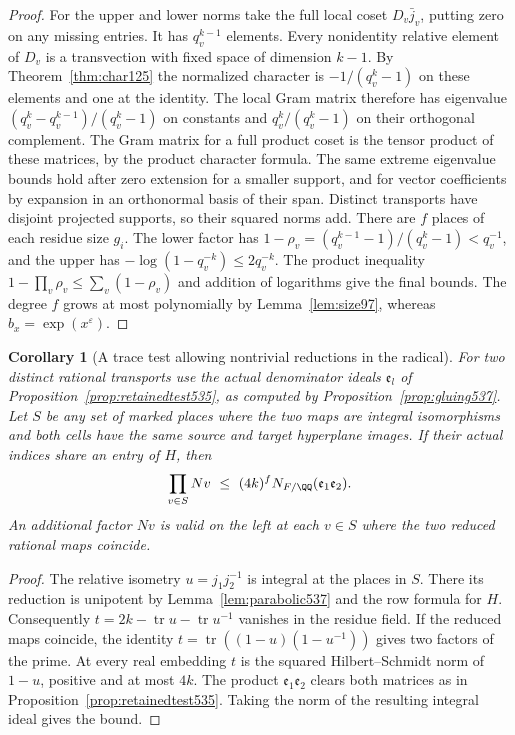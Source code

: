 \documentclass[a4paper,11pt]{article}
\newtheorem{corollary}[proposition]{Corollary}
\theoremstyle{definition}
\theoremstyle{remark}
\numberwithin{equation}{section}
\begin{document}
\begin{proof}
For the upper and lower norms take the full local coset
\(D_v\bar j_v\), putting zero on any missing entries.
It has \(q_v^{k-1}\) elements. Every nonidentity relative
element of \(D_v\) is a transvection with fixed space of
dimension \(k-1\). By Theorem~\ref{thm:char125} the normalized
character is \(-1/(q_v^k-1)\) on these elements and one at
the identity. The local Gram matrix therefore has eigenvalue
\((q_v^k-q_v^{k-1})/(q_v^k-1)\) on constants and
\(q_v^k/(q_v^k-1)\) on their orthogonal complement. The
Gram matrix for a full product coset is the tensor product of
these matrices, by the product character formula. The same
extreme eigenvalue bounds hold after zero extension for a
smaller support, and for vector coefficients by expansion in
an orthonormal basis of their span. Distinct transports have
disjoint projected supports, so their squared norms add.
There are \(f\) places of each residue size \(g_i\). The lower
factor has \(1-\rho_v=(q_v^{k-1}-1)/(q_v^k-1)<q_v^{-1}\),
and the upper has \(-\log(1-q_v^{-k})\le 2q_v^{-k}\).
The product inequality \(1-\prod_v\rho_v\le\sum_v(1-\rho_v)\)
and addition of logarithms give the final bounds. The degree
\(f\) grows at most polynomially by Lemma~\ref{lem:size97},
whereas \(b_x=\exp(x^\varepsilon)\).
\end{proof}

\begin{corollary}[A trace test allowing nontrivial reductions in the radical]
\leavevmode\label{cor:parabolictrace537}
For two distinct rational transports use the actual denominator
ideals \(\mathfrak e_l\) of Proposition~\ref{prop:retainedtest535},
as computed by Proposition~\ref{prop:gluing537}. Let \(S\)
be any set of marked places where the two maps are integral
isomorphisms and both cells have the same source and target
hyperplane images. If their actual indices share an entry of
\(H\), then
\[
       \prod_{v\in S}Nv\ \le\
                 (4k)^f N_{F/\QQ}(\mathfrak e_1\mathfrak e_2).
\]
An additional factor \(Nv\) is valid on the left at each
\(v\in S\) where the two reduced rational maps coincide.
\end{corollary}
\begin{proof}
The relative isometry \(u=j_1j_2^{-1}\) is integral at the
places in \(S\). There its reduction is unipotent by
Lemma~\ref{lem:parabolic537} and the row formula for \(H\).
Consequently \(t=2k-\operatorname{tr}u-\operatorname{tr}u^{-1}\)
vanishes in the residue field. If the reduced maps coincide,
the identity \(t=\operatorname{tr}((1-u)(1-u^{-1}))\) gives
two factors of the prime. At every real embedding \(t\) is
the squared Hilbert--Schmidt norm of \(1-u\), positive and at
most \(4k\). The product \(\mathfrak e_1\mathfrak e_2\)
clears both matrices as in Proposition~\ref{prop:retainedtest535}.
Taking the norm of the resulting integral ideal gives the bound.
\end{proof}
\end{document}

